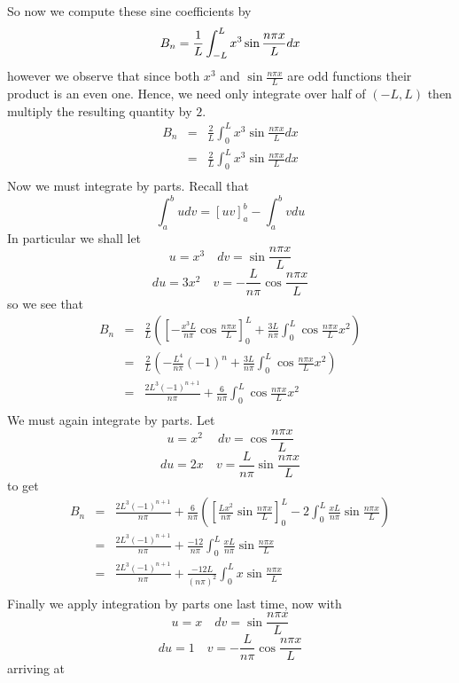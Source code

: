 \documentclass[12pt]{article}
\begin{document}
So now we compute these sine coefficients by 
\[B_n = \frac{1}{L} \int_{-L}^L x^3 \sin{\frac{n \pi x}{L}} dx\\
\]
however we observe that since both $x^3$ and $\sin{\frac{n \pi x}{L}}$ are odd functions their product is an even one. Hence, we need only integrate over half of $(-L,L)$ then multiply the resulting quantity by $2$.
\begin{eqnarray*}B_n &=& \frac{2}{L} \int_{0}^L x^3 \sin{\frac{n \pi x}{L}} dx\\
&=& \frac{2}{L} \int_{0}^L x^3 \sin{\frac{n \pi x}{L}} dx\\
\end{eqnarray*}
Now we must integrate by parts. Recall that
\[\int_a^b u dv = \left[u v \right]_a^b - \int_a^b v du\]
In particular we shall let
\[u=x^3 \quad dv=\sin{\frac{n \pi x}{L}}\]
\[du=3 x^2 \quad v= -\frac{L}{n \pi} \cos{\frac{n \pi x}{L}}\]
so we see that
\begin{eqnarray*}B_n &=& \frac{2 }{L} \left( \left[-\frac{x^3 L}{n \pi} \cos{\frac{n \pi x}{L}}  \right]_{0}^L + \frac{3 L}{n \pi} \int_{0}^L   \cos{\frac{n \pi x}{L}}  x^2  \right) \\
&=& \frac{2 }{L} \left( -\frac{L^4 }{n \pi} (-1)^n   + \frac{3 L}{n \pi} \int_{0}^L   \cos{\frac{n \pi x}{L}}  x^2  \right) \\
&=&   \frac{2 L^3 (-1)^{n+1} }{n \pi}    + \frac{6 }{n \pi} \int_{0}^L   \cos{\frac{n \pi x}{L}}  x^2 \\
\end{eqnarray*}
We must again integrate by parts. Let
\[u=x^2 \quad \ dv=\cos{\frac{n \pi x }{L}}\]
\[du=2x \quad v= \frac{L}{n \pi } \sin{\frac{n \pi x}{L}}\]
to get 
\begin{eqnarray*}B_n &=&  \frac{2 L^3 (-1)^{n+1} }{n \pi}    + \frac{6 }{n \pi} \left( \left[ \frac{L x^2}{n \pi} \sin{\frac{n \pi x}{L}} \right]_0^L - 2 \int_0^L \frac{xL}{n\pi} \sin{\frac{n \pi x}{L}} \right) \\
&=&  \frac{2 L^3 (-1)^{n+1} }{n \pi}    + \frac{-12 }{n \pi}  \int_0^L \frac{xL}{n\pi} \sin{\frac{n \pi x}{L}}   \\
&=&  \frac{2 L^3 (-1)^{n+1} }{n \pi}    + \frac{-12 L}{(n \pi)^2}  \int_0^L x \sin{\frac{n \pi x}{L}}   \\
\end{eqnarray*}
Finally we apply integration by parts one last time, now with
\[u=x \quad dv = \sin{\frac{n \pi x}{L}} \]
\[ du = 1 \quad v = - \frac{L}{n \pi } \cos{\frac{n \pi x}{L}} \]
arriving at 
\end{document}
